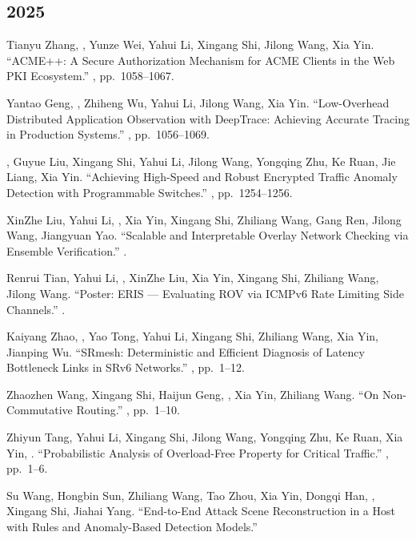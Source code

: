 \documentclass[11pt]{article}
\begin{document}
\subsection*{2025}
\begin{publist}
\item Tianyu Zhang, \corr, Yunze Wei, Yahui Li, Xingang Shi, Jilong
Wang, Xia Yin. ``ACME++: A Secure Authorization Mechanism for ACME Clients in the Web PKI
Ecosystem.''
, pp.~1058--1067.
\item Yantao Geng, \corr, Zhiheng Wu, Yahui Li, Jilong Wang, Xia Yin.
``Low-Overhead Distributed Application Observation with DeepTrace: Achieving Accurate
Tracing in Production Systems.'' , pp.~1056--1069.
\item {}, Guyue Liu\corr, Xingang Shi, Yahui Li, Jilong Wang, Yongqing
Zhu, Ke Ruan, Jie Liang, Xia Yin. ``Achieving High-Speed and Robust Encrypted Traffic
Anomaly Detection with Programmable Switches.'' ,
pp.~1254--1256.
\item XinZhe Liu, Yahui Li\corr, , Xia Yin, Xingang Shi, Zhiliang Wang,
Gang Ren, Jilong Wang, Jiangyuan Yao. ``Scalable and Interpretable Overlay Network
Checking via Ensemble Verification.'' .
\item Renrui Tian, Yahui Li\corr, , XinZhe Liu, Xia Yin, Xingang Shi,
Zhiliang Wang, Jilong Wang. ``Poster: ERIS --- Evaluating ROV via ICMPv6 Rate Limiting
Side Channels.'' .
\item Kaiyang Zhao, \corr, Yao Tong, Yahui Li, Xingang Shi, Zhiliang
Wang, Xia Yin, Jianping Wu. ``SRmesh: Deterministic and Efficient Diagnosis of Latency
Bottleneck Links in SRv6 Networks.'' , pp.~1--12.
\item Zhaozhen Wang, Xingang Shi\corr, Haijun Geng, , Xia Yin, Zhiliang
Wang. ``On Non-Commutative Routing.'' , pp.~1--10.
\item Zhiyun Tang, Yahui Li, Xingang Shi, Jilong Wang, Yongqing Zhu, Ke Ruan, Xia Yin,
\corr. ``Probabilistic Analysis of Overload-Free Property for Critical
Traffic.'' , pp.~1--6.
\item Su Wang, Hongbin Sun, Zhiliang Wang, Tao Zhou, Xia Yin, Dongqi Han, , Xingang Shi, Jiahai Yang. ``End-to-End Attack Scene Reconstruction in a Host
with Rules and Anomaly-Based Detection Models.'' 
\end{publist}
\end{document}
